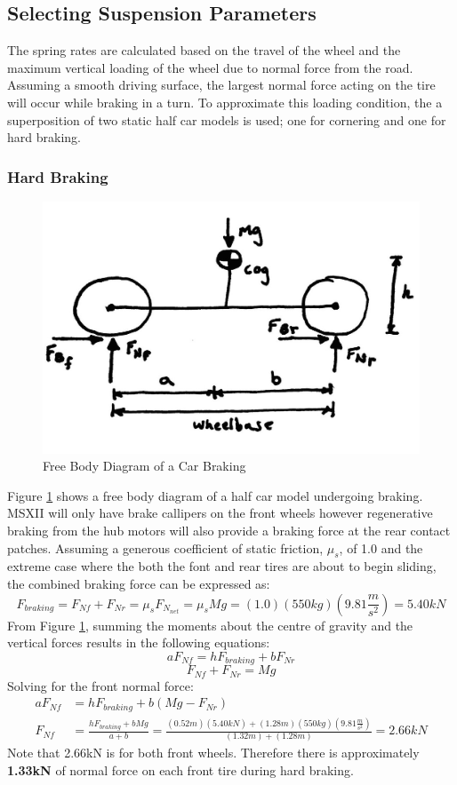 \documentclass[12pt]{article}
\begin{document}
\subsection{Selecting Suspension Parameters}
\label{sec:paramSelection}
The spring rates are calculated based on the travel of the wheel and the maximum vertical loading of the wheel due to normal force from the road. Assuming a smooth driving surface, the largest normal force acting on the tire will occur while braking in a turn. To approximate this loading condition, the a superposition of two static half car models is used; one for cornering and one for hard braking.  
\subsubsection{Hard Braking}\begin{figure}[h!]
	\centering
	\includegraphics[width=.5\textwidth]{./LaTex/brakingFBD.jpg}
	\caption{Free Body Diagram of a Car Braking}
	\label{fig:barkingFBD}
\end{figure}
Figure \ref{fig:barkingFBD} shows a free body diagram of a half car model undergoing braking. MSXII will only have brake callipers on the front wheels however regenerative braking from the hub motors will also provide a braking force at the rear contact patches. Assuming a generous coefficient of static friction, $\mu _s$, of 1.0 and the extreme case where the both the font and rear tires are about to begin sliding, the combined braking force can be expressed as: 
\begin{equation}
	F_{braking} = F_{Nf} + F_{Nr} = \mu _s F_{N_{net}} =  \mu _s Mg = (1.0)(550kg)\left(9.81\frac{m}{s^2}\right) = 5.40kN
\end{equation}
From Figure \ref{fig:barkingFBD}, summing the moments about the centre of gravity and the vertical forces results in the following equations: 
\begin{equation}
	aF_{Nf} = hF_{braking} + bF_{Nr}
\end{equation}
\begin{equation}
	F_{Nf} + F_{Nr} = Mg
\end{equation}
Solving for the front normal force: 
\begin{equation}
\begin{split}
	aF_{Nf} &= hF_{braking} + b(Mg - F_{Nr})\\
	F_{Nf} &= \frac{hF_{braking} + bMg}{a+b} = \frac{(0.52m)(5.40kN)+(1.28m)(550kg)\left(9.81\frac{m}{s^2}\right)}{(1.32m)+(1.28m)} = 2.66kN
\end{split}
\end{equation}
Note that 2.66kN is for both front wheels. Therefore there is approximately \textbf{1.33kN} of normal force on each front tire during hard braking. 
\end{document}
